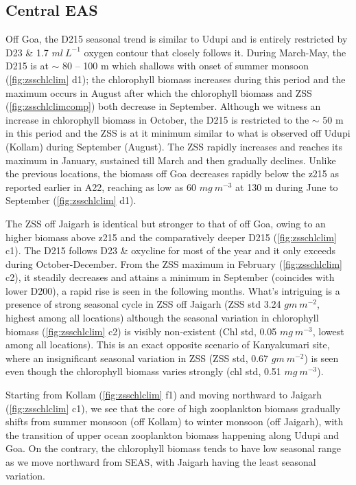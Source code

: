 \documentclass{article}
\begin{document}
	\subsection{Central EAS}
	Off Goa, the D215 seasonal trend is similar to Udupi and is entirely restricted by D23 \& 1.7 $ml \ L^{-1}$ oxygen contour that closely follows it. During March-May, the D215 is at $\sim$ 80 -- 100 m which shallows with onset of summer monsoon (\cref{fig:zsschlclim} d1); the chlorophyll biomass increases during this period and the maximum occurs in August after which the chlorophyll biomass and ZSS (\cref{fig:zsschlclimcomp}) both decrease in September. Although we witness an increase in chlorophyll biomass in October, the D215 is restricted to the $\sim$ 50 m in this period  and the ZSS is at it minimum  similar to what is observed off Udupi (Kollam) during September (August). The ZSS rapidly increases and reaches its maximum in January, sustained till March and then gradually declines. Unlike the previous locations, the biomass off Goa decreases rapidly below the z215 as reported earlier in A22, reaching as low as 60 $mg \ m^{-3}$ at 130 m during June to September (\cref{fig:zsschlclim} d1).
	 
	
	The ZSS off Jaigarh is identical but stronger to that of off Goa, owing to an higher biomass above z215 and the comparatively deeper D215 (\cref{fig:zsschlclim} c1). The D215 follows D23 \& oxycline for most of the year and it only exceeds during October-December.  From the ZSS maximum in February (\cref{fig:zsschlclim} c2), it steadily decreases and attains a minimum in September (coincides with lower D200), a rapid rise is seen in the following months. What's intriguing is a presence of strong seasonal cycle in ZSS off Jaigarh (ZSS std 3.24 $gm\ m^{-2}$, highest among all locations) although the seasonal variation in chlorophyll biomass (\cref{fig:zsschlclim} c2) is visibly non-existent (Chl std, 0.05 $mg\ m^{-3}$, lowest among all locations). This is an exact opposite scenario of Kanyakumari site, where an insignificant seasonal variation in ZSS (ZSS std, 0.67 $gm\ m^{-2}$) is seen even though the chlorophyll biomass varies strongly (chl std, 0.51 $mg\ m^{-3}$). 
		
	Starting from Kollam (\cref{fig:zsschlclim} f1) and moving northward to Jaigarh (\cref{fig:zsschlclim} c1), we see that the core of high zooplankton biomass gradually shifts from summer monsoon (off Kollam) to winter monsoon (off Jaigarh), with the transition of upper ocean zooplankton biomass happening along Udupi and Goa. On the contrary, the chlorophyll biomass tends to have low seasonal range as we move northward from SEAS, with Jaigarh having the least seasonal variation.
	 
\end{document}
